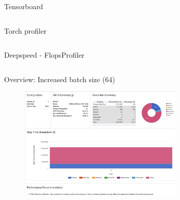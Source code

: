 \documentclass[compress,aspectratio=169]{beamer}
\begin{document}
\begin{frame}[fragile]{Tensorboard}
        \footnotesize\inputminted[xleftmargin=1em,linenos,fontsize=\scriptsize, highlightlines={1,3,9-12,14-16}]{python}{./assets/tensorboard.py}
\end{frame}

\begin{frame}[fragile]{Torch profiler}
        \footnotesize\inputminted[xleftmargin=1em,linenos,fontsize=\scriptsize, highlightlines={4-10,14,15}]{python}{./assets/profiler-torch.py}
\end{frame}

\begin{frame}[fragile]{Deepspeed - FlopsProfiler}
        \footnotesize\inputminted[xleftmargin=1em,linenos,fontsize=\scriptsize, highlightlines={1,3,4,8,9,11-18}]{python}{./assets/deepspeed.py}
\end{frame}

\begin{frame}{Overview: Increased batch size (64)}
    \vspace{-1em}
\begin{center}
    \begin{figure}
        \includegraphics[width=0.7\textwidth]{./assets/scap_gtx1080_profiler-torch_batch-size-64_14650758}
    \end{figure}
    \end{center}

\end{frame}
\end{document}
